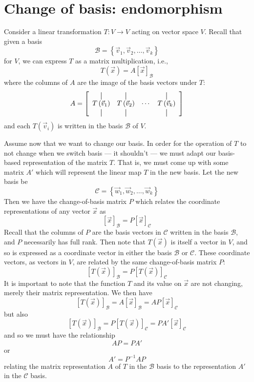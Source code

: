 \section{Change of basis: endomorphism}
Consider a linear transformation $T: V \rightarrow V$ acting on vector space $V$. Recall that given a basis \[ \mathcal{B} = \left\{\vec{v}_1, \vec{v}_2,\ldots, \vec{v}_k \right\} \] for $V$, we can express $T$ as a matrix multiplication, i.e., \[ T\left(\vec{x}\right) = A \left[ \vec{x} \right]_{\mathcal{B}} \] where the columns of $A$ are the image of the basis vectors under $T$: \[ A = \left[ \begin{array}{cccc} \vertbar & \vertbar & & \vertbar \\
T\left(\vec{v}_1\right) & T\left(\vec{v}_2\right) & \cdots & T\left(\vec{v}_k\right) \\ \vertbar & \vertbar & & \vertbar \end{array} \right] \] and each $T\left(\vec{v}_i\right)$ is written in the basis $\mathcal{B}$ of $V$. 

Assume now that we want to change our basis. In order for the operation of $T$ to not change when we switch basis --- it shouldn't --- we must adapt our basis-based representation of the matrix $T$. That is, we must come up with some matrix $A'$ which will represent the linear map $T$ in the new basis. Let the new basis be \[ \mathcal{C} = \left\{ \vec{w}_1, \vec{w}_2,\ldots, \vec{w}_k \right\} \] Then we have the change-of-basis matrix $P$ which relates the coordinate representations of any vector $\vec{x}$ as \[ \left[\vec{x}\right]_{\mathcal{B}} = P \left[ \vec{x} \right]_{\mathcal{C}} \] Recall that the columns of $P$ are the basis vectors in $\mathcal{C}$ written in the basis $\mathcal{B}$, and $P$ necessarily has full rank. Then note that $T\left(\vec{x}\right)$ is itself a vector in $V$, and so is expressed as a coordinate vector in either the basis $\mathcal{B}$ or $\mathcal{C}$. These coordinate vectors, as vectors in $V$, are related by the same change-of-basis matrix $P$: \[ \left[ T\left(\vec{x}\right) \right]_{\mathcal{B}} = P \left[ T\left(\vec{x}\right) \right]_{\mathcal{C}} \] It is important to note that the function $T$ and its value on $\vec{x}$ are not changing, merely their matrix representation. We then have
\[ \left[ T\left(\vec{x}\right) \right]_{\mathcal{B}} = A \left[ \vec{x}\right]_{\mathcal{B}} = AP \left[ \vec{x} \right]_{\mathcal{C}} \] but also \[ \left[ T\left(\vec{x}\right) \right]_{\mathcal{B}} = P \left[ T\left(\vec{x}\right) \right]_{\mathcal{C}} = P A' \left[\vec{x}\right]_{\mathcal{C}} \] and so we must have the relationship \[ AP = PA' \] or \[ A' = P^{-1}AP \] relating the matrix representation $A$ of $T$ in the $\mathcal{B}$ basis to the representation $A'$ in the $\mathcal{C}$ basis.

